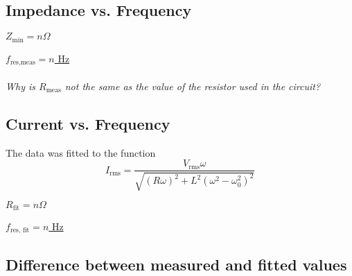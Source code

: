 \documentclass[twocolumn,english]{IEEEtran}
\theoremstyle{plain}
\theoremstyle{plain}
\begin{document}
\subsection{Impedance vs. Frequency}

%

\underline{$Z_{\text{min}} = n \Omega$}

\underline{$f_{\text{res,meas}} = n$ Hz} \\ \\

\textit{Why is $R_{\text{meas}}$ not the same as the value of the resistor used in the circuit?}

\hrulefill

\subsection{Current vs. Frequency}

The data was fitted to the function
\begin{equation}
	I_{\text{rms}}
	= \frac
	{V_{\text{rms}}\omega}
	{\sqrt{(R\omega)^2 +L^2(\omega^2-\omega_0^2)^2}}
\end{equation}


\underline{$R_{\text{fit}} = n \Omega$}

\underline{$f_{\text{res, fit}} = n$ Hz}

\hrulefill

\subsection{Difference between measured and fitted values}
\end{document}
